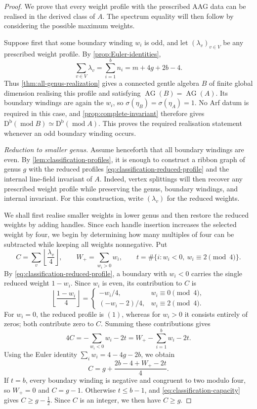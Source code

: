 \documentclass[11pt]{amsart}
\theoremstyle{definition}
\theoremstyle{plain}
\theoremstyle{definition}
\theoremstyle{definition}
\newcommand{\Db}{\mathrm D^{\mathrm b}}
\newcommand{\modu}{\operatorname{mod}}
\newcommand{\AG}{\operatorname{AG}}
\begin{document}
\begin{proof}
We prove that every weight profile with the prescribed AAG data
can be realised in the derived class of $A$.
The spectrum equality will then follow by considering the
possible maximum weights.

Suppose first that some boundary winding $w_i$ is odd, and
let $(\lambda_v)_{v\in V}$ be any prescribed weight profile.
By \cref{prop:Euler-identities},
\[
 \sum_{v\in V}\lambda_v
 =\sum_{i=1}^b n_i
 =m+4g+2b-4.
\]
Thus \cref{thm:all-genus-realization} gives a connected gentle
algebra $B$ of finite global dimension realising this profile
and satisfying $\AG(B)=\AG(A)$.
Its boundary windings are again the $w_i$, so
$\sigma(\eta_B)=\sigma(\eta_A)=1$.
No Arf datum is required in this case, and
\cref{prop:complete-invariant} therefore gives
$\Db(\modu B)\simeq\Db(\modu A)$.
This proves the required realisation statement whenever an
odd boundary winding occurs.

\smallskip
\noindent\emph{Reduction to smaller genus.}
Assume henceforth that all boundary windings are even.
By \cref{lem:classification-profiles}, it is enough to
construct a ribbon graph of genus $g$ with the reduced
profiles \eqref{eq:classification-reduced-profile} and
the internal line-field invariant of $A$.
Indeed, vertex splittings will then recover any prescribed
weight profile while preserving the genus, boundary windings,
and internal invariant.
For this construction, write $(\lambda_v)$ for the reduced
weights.

We shall first realise smaller weights in lower genus and
then restore the reduced weights by adding handles.
Since each handle insertion increases the selected weight
by four, we begin by determining how many multiples of four
can be subtracted while keeping all weights nonnegative.
Put
\[
 C=\sum_v\left\lfloor\frac{\lambda_v}{4}\right\rfloor,
 \qquad
 W_+=\sum_{w_i>0}w_i,
 \qquad
 t=\#\{i:w_i<0,\ w_i\equiv2\pmod4\}.
\]
By \eqref{eq:classification-reduced-profile}, a boundary
with $w_i<0$ carries the single reduced weight $1-w_i$.
Since $w_i$ is even, its contribution to $C$ is
\[
 \left\lfloor\frac{1-w_i}{4}\right\rfloor
 =
 \begin{cases}
  -w_i/4,&w_i\equiv0\pmod4,\\[2pt]
  (-w_i-2)/4,&w_i\equiv2\pmod4.
 \end{cases}
\]
For $w_i=0$, the reduced profile is $(1)$, whereas for
$w_i>0$ it consists entirely of zeros; both contribute
zero to $C$.
Summing these contributions gives
\[
 4C=-\sum_{w_i<0}w_i-2t
    =W_+-\sum_{i=1}^b w_i-2t.
\]
Using the Euler identity $\sum_iw_i=4-4g-2b$, we obtain
\begin{equation}
\label{eq:classification-capacity}
 C=g+\frac{2b-4+W_+-2t}{4}.
\end{equation}
If $t=b$, every boundary winding is negative and congruent
to two modulo four, so $W_+=0$ and $C=g-1$.
Otherwise $t\leq b-1$, and
\eqref{eq:classification-capacity} gives
$C\geq g-\frac12$.
Since $C$ is an integer, we then have $C\geq g$.


\end{proof}
\end{document}
